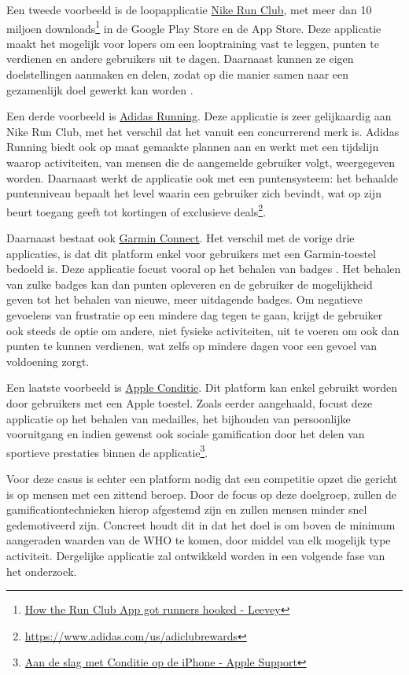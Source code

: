 Een tweede voorbeeld is de loopapplicatie \href{https://www.nike.com/be/en/nrc-app}{Nike Run Club}, met meer dan 10 miljoen downloads\footnote{\href{https://bootcamp.uxdesign.cc/how-the-nike-run-club-app-got-runners-hooked-2850c7654fc5}{How the Run Club App got runners hooked - Leevey}} in de Google Play Store en de App Store. Deze applicatie maakt het mogelijk voor lopers om een looptraining vast te leggen, punten te verdienen en andere gebruikers uit te dagen. Daarnaast kunnen ze eigen doelstellingen aanmaken en delen, zodat op die manier samen naar een gezamenlijk doel gewerkt kan worden \autocite{StaalnackeLarsson2013}.

Een derde voorbeeld is \href{https://www.runtastic.com/}{Adidas Running}. Deze applicatie is zeer gelijkaardig aan Nike Run Club, met het verschil dat het vanuit een concurrerend merk is. Adidas Running biedt ook op maat gemaakte plannen aan en werkt met een tijdslijn waarop activiteiten, van mensen die de aangemelde gebruiker volgt, weergegeven worden. Daarnaast werkt de applicatie ook met een puntensysteem: het behaalde puntenniveau bepaalt het level waarin een gebruiker zich bevindt, wat op zijn beurt toegang geeft tot kortingen of exclusieve deals\footnote{\href{https://www.adidas.com/us/adiclubrewards}{https://www.adidas.com/us/adiclubrewards}}.

Daarnaast bestaat ook \href{https://connect.garmin.com/}{Garmin Connect}. Het verschil met de vorige drie applicaties, is dat dit platform enkel voor gebruikers met een Garmin-toestel bedoeld is. Deze applicatie focust vooral op het behalen van badges \autocite{Ilhan2019}. Het behalen van zulke badges kan dan punten opleveren en de gebruiker de mogelijkheid geven tot het behalen van nieuwe, meer uitdagende badges. Om negatieve gevoelens van frustratie op een mindere dag tegen te gaan, krijgt de gebruiker ook steeds de optie om andere, niet fysieke activiteiten, uit te voeren om ook dan punten te kunnen verdienen, wat zelfs op mindere dagen voor een gevoel van voldoening zorgt.

Een laatste voorbeeld is \href{https://support.apple.com/nl-be/guide/iphone/ipha5dddb411/ios}{Apple Conditie}. Dit platform kan enkel gebruikt worden door gebruikers met een Apple toestel. Zoals eerder aangehaald, focust deze applicatie op het behalen van medailles, het bijhouden van persoonlijke vooruitgang en indien gewenst ook sociale gamification door het delen van sportieve prestaties binnen de applicatie\footnote{\href{https://support.apple.com/nl-be/guide/iphone/ipha5dddb411/ios}{Aan de slag met Conditie op de iPhone - Apple Support}}.

Voor deze casus is echter een platform nodig dat een competitie opzet die gericht is op mensen met een zittend beroep. Door de focus op deze doelgroep, zullen de gamificationtechnieken hierop afgestemd zijn en zullen mensen minder snel gedemotiveerd zijn. Concreet houdt dit in dat het doel is om boven de minimum aangeraden waarden van de WHO te komen, door middel van elk mogelijk type activiteit. Dergelijke applicatie zal ontwikkeld worden in een volgende fase van het onderzoek.
